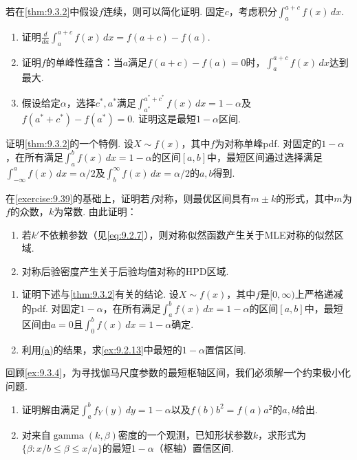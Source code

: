\begin{exercise}\label{exercise:9.38}
若在\autoref{thm:9.3.2}中假设$f$连续，则可以简化证明. 固定$c$，考虑积分$\int_a^{a+c}f(x)\,dx$.
\begin{enumerate}
\item 证明$\frac d{da}\int_a^{a+c}f(x)\,dx=f(a+c)-f(a)$.
\item 证明$f$的单峰性蕴含：当$a$满足$f(a+c)-f(a)=0$时，$\int_a^{a+c}f(x)\,dx$达到最大.
\item 假设给定$\alpha$，选择$c^*,a^*$满足$\int_{a^*}^{a^*+c^*}f(x)\,dx=1-\alpha$及$f(a^*+c^*)-f(a^*)=0$. 证明这是最短$1-\alpha$区间.
\end{enumerate}
\end{exercise}
\begin{exercise}\label{exercise:9.39}
证明\autoref{thm:9.3.2}的一个特例. 设$X\sim f(x)$，其中$f$为对称单峰pdf. 对固定的$1-\alpha$，在所有满足$\int_a^b f(x)\,dx=1-\alpha$的区间$[a,b]$中，最短区间通过选择满足$\int_{-\infty}^a f(x)\,dx=\alpha/2$及$\int_b^\infty f(x)\,dx=\alpha/2$的$a,b$得到.
\end{exercise}
\begin{exercise}\label{exercise:9.40}
在\autoref{exercise:9.39}的基础上，证明若$f$对称，则最优区间具有$m\pm k$的形式，其中$m$为$f$的众数，$k$为常数. 由此证明：
\begin{enumerate}
\item 若$k'$不依赖参数（见\eqref{eq:9.2.7}），则对称似然函数产生关于MLE对称的似然区域.
\item 对称后验密度产生关于后验均值对称的HPD区域.
\end{enumerate}
\end{exercise}
\begin{exercise}\label{exercise:9.41}\leavevmode
\begin{enumerate}
\item\label{item:9.41.a}证明下述与\autoref{thm:9.3.2}有关的结论. 设$X\sim f(x)$，其中$f$是$[0,\infty)$上严格递减的pdf. 对固定$1-\alpha$，在所有满足$\int_a^b f(x)\,dx=1-\alpha$的区间$[a,b]$中，最短区间由$a=0$且$\int_0^b f(x)\,dx=1-\alpha$确定.
\item 利用\hyperref[item:9.41.a]{(a)}的结果，求\autoref{ex:9.2.13}中最短的$1-\alpha$置信区间.
\end{enumerate}
\end{exercise}
\begin{exercise}\label{exercise:9.42}
回顾\autoref{ex:9.3.4}，为寻找伽马尺度参数的最短枢轴区间，我们必须解一个约束极小化问题.
\begin{enumerate}
\item 证明解由满足$\int_a^b f_Y(y)\,dy=1-\alpha$以及$f(b)b^2=f(a)a^2$的$a,b$给出.
\item 对来自$\operatorname{gamma}(k,\beta)$密度的一个观测，已知形状参数$k$，求形式为$\{\beta:x/b\le\beta\le x/a\}$的最短$1-\alpha$（枢轴）置信区间.
\end{enumerate}
\end{exercise}
